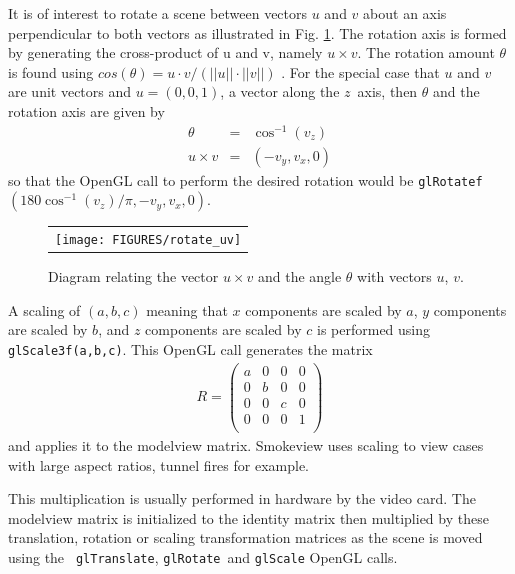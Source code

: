 \documentclass[11pt,twoside]{book}
\begin{document}
It is of interest to rotate a scene between vectors $u$ and $v$
about an axis perpendicular to both vectors as illustrated in Fig.
\ref{figrotateuv}. The rotation axis is formed by generating the
cross-product of u and v, namely $u\times v$.  The rotation amount
$\theta$ is found using $cos(\theta)=u\cdot v/(||u||\cdot ||v||)$
.  For the special case that $u$ and $v$ are unit vectors and
$u=(0,0,1)$, a vector along the $z$~axis, then $\theta$ and the
rotation axis are given by
\begin{eqnarray}
\theta&=&\cos^{-1}(v_z)\\
u\times v&=&(-v_y,v_x,0)
\end{eqnarray}
so that the OpenGL call to perform the desired rotation would be
{\tt glRotatef}$(180\cos^{-1}(v_z)/\pi,-v_y,v_x,0)$.

\begin{figure}[\figoptions]
\begin{center}
\begin{tabular}{c}
\texttt{[image: FIGURES/rotate\_uv]}
\end{tabular}
\end{center}
\caption{Diagram relating the vector $u\times v$ and the angle $\theta$
with vectors $u$, $v$. }
\label{figrotateuv}
\end{figure}

A scaling of $(a,b,c)$ meaning that $x$ components are scaled by
$a$, $y$ components are scaled by $b$, and $z$ components are
scaled by $c$ is performed using {\tt glScale3f(a,b,c)}. This
OpenGL call generates the matrix
\begin{eqnarray}
R=\left(%
\begin{array}{cccc}
  a & 0 & 0 & 0 \\
  0 & b & 0 & 0 \\
  0 & 0 & c & 0 \\
  0 & 0 & 0 & 1 \\
\end{array}%
\right)
\end{eqnarray}
and applies it to the modelview matrix. Smokeview uses scaling to
view cases with large aspect ratios, tunnel fires for example.

This multiplication is usually performed in hardware by the video
card.  The modelview matrix is initialized to the identity matrix
then multiplied by these translation, rotation or scaling
transformation matrices as the scene is moved using the {\tt
glTranslate}, {\tt glRotate}\ and {\tt glScale} OpenGL calls.
\end{document}
